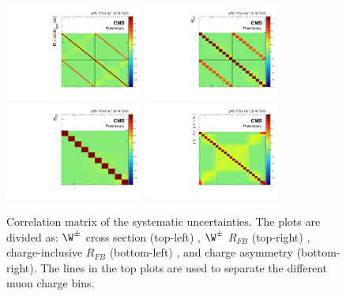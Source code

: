 \begin{figure}[!htbp]
 \begin{center}
  \includegraphics[width=0.40\textwidth]{Figures/WBoson/Analysis/CovarianceMatrix/PA/Cross_Section/covMatrix_WToMuPl_PA_Cross_Section_Total_Total.pdf}
  \includegraphics[width=0.40\textwidth]{Figures/WBoson/Analysis/CovarianceMatrix/PA/ForwardBackward_Ratio/covMatrix_WToMuPl_PA_ForwardBackward_Ratio_Total_Total.pdf}
  \includegraphics[width=0.40\textwidth]{Figures/WBoson/Analysis/CovarianceMatrix/PA/ForwardBackward_Ratio/covMatrix_WToMu_PA_ForwardBackward_Ratio_Total_Total.pdf}
  \includegraphics[width=0.40\textwidth]{Figures/WBoson/Analysis/CovarianceMatrix/PA/Charge_Asymmetry/covMatrix_WToMu_PA_Charge_Asymmetry_Total_Total.pdf}
 \end{center}
 \caption{Correlation matrix of the systematic uncertainties. The plots are divided as: $\W^{\pm}$ cross section (top-left) , $\W^{\pm}$ $R_{FB}$ (top-right) , charge-inclusive $R_{FB}$ (bottom-left) , and charge asymmetry (bottom-right). The lines in the top plots are used to separate the different muon charge bins.}
 \label{fig:CorrelationMatrix}
\end{figure}


\clearpage

